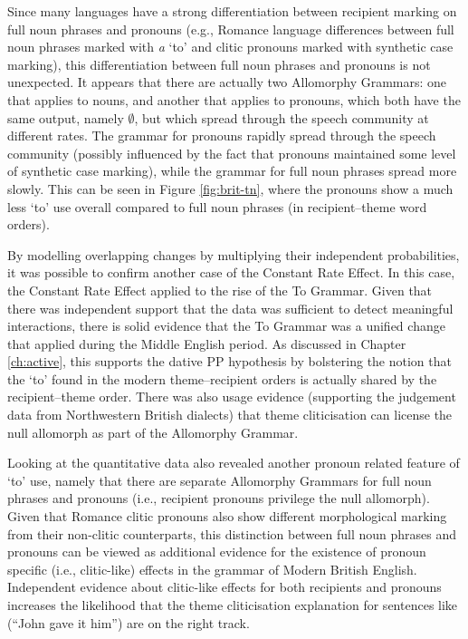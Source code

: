 	Since many languages have a strong differentiation between recipient marking on full noun phrases and pronouns (e.g., Romance language differences between full noun phrases marked with \textit{a} `to' and clitic pronouns marked with synthetic case marking), this differentiation between full noun phrases and pronouns is not unexpected. It appears that there are actually two Allomorphy Grammars: one that applies to nouns, and another that applies to pronouns, which both have the same output, namely $\emptyset$, but which spread through the speech community at different rates. The grammar for pronouns rapidly spread through the speech community (possibly influenced by the fact that pronouns maintained some level of synthetic case marking), while the grammar for full noun phrases spread more slowly. This can be seen in Figure \ref{fig:brit-tn}, where the pronouns show a much less `to' use overall compared to full noun phrases (in recipient--theme word orders).

	By modelling overlapping changes by multiplying their independent probabilities, it was possible to confirm another case of the Constant Rate Effect. In this case, the Constant Rate Effect applied to the rise of the To Grammar. Given that there was independent support that the data was sufficient to detect meaningful interactions, there is solid evidence that the To Grammar was a unified change that applied during the Middle English period. As discussed in Chapter \ref{ch:active}, this supports the dative PP hypothesis by bolstering the notion that the `to' found in the modern theme--recipient orders is actually shared by the recipient--theme order. There was also usage evidence (supporting the judgement data from Northwestern British dialects) that theme cliticisation can license the null allomorph as part of the Allomorphy Grammar.
	
	Looking at the quantitative data also revealed another pronoun related feature of `to' use, namely that there are separate Allomorphy Grammars for full noun phrases and pronouns (i.e., recipient pronouns privilege the null allomorph). Given that Romance clitic pronouns also show different morphological marking from their non-clitic counterparts, this distinction between full noun phrases and pronouns can be viewed as additional evidence for the existence of pronoun specific (i.e., clitic-like) effects in the grammar of Modern British English. Independent evidence about clitic-like effects for both recipients and pronouns increases the likelihood that the theme cliticisation explanation for sentences like (``John gave it him'') are on the right track.

